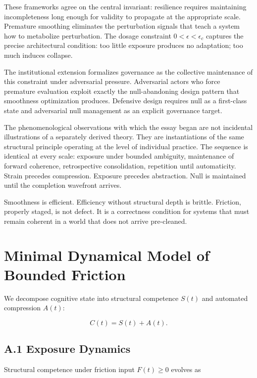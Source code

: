 \documentclass[11pt]{article}
\theoremstyle{remark}
\begin{document}
These frameworks agree on the central invariant: resilience requires maintaining incompleteness long enough for validity to propagate at the appropriate scale. Premature smoothing eliminates the perturbation signals that teach a system how to metabolize perturbation. The dosage constraint $0 < \epsilon < \epsilon_c$ captures the precise architectural condition: too little exposure produces no adaptation; too much induces collapse.

The institutional extension formalizes governance as the collective maintenance of this constraint under adversarial pressure. Adversarial actors who force premature evaluation exploit exactly the null-abandoning design pattern that smoothness optimization produces. Defensive design requires null as a first-class state and adversarial null management as an explicit governance target.

The phenomenological observations with which the essay began are not incidental illustrations of a separately derived theory. They are instantiations of the same structural principle operating at the level of individual practice. The sequence is identical at every scale: exposure under bounded ambiguity, maintenance of forward coherence, retrospective consolidation, repetition until automaticity. Strain precedes compression. Exposure precedes abstraction. Null is maintained until the completion wavefront arrives.

Smoothness is efficient. Efficiency without structural depth is brittle. Friction, properly staged, is not defect. It is a correctness condition for systems that must remain coherent in a world that does not arrive pre-cleaned.


\appendix

\section{Minimal Dynamical Model of Bounded Friction}
\label{app:dynamics}

We decompose cognitive state into structural competence $S(t)$ and automated compression $A(t)$:

\[
C(t) = S(t) + A(t).
\]

\subsection*{A.1 Exposure Dynamics}

Structural competence under friction input $F(t) \geq 0$ evolves as
\end{document}
